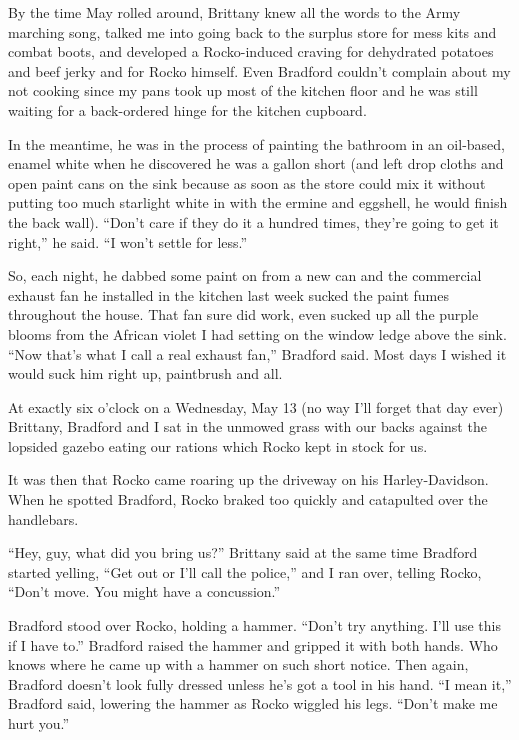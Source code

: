 \documentclass[
]{article}
\begin{document}
By the time May rolled around, Brittany knew all the words to the Army
marching song, talked me into going back to the surplus store for mess
kits and combat boots, and developed a Rocko-induced craving for
dehydrated potatoes and beef jerky and for Rocko himself. Even Bradford
couldn't complain about my not cooking since my pans took up most of the
kitchen floor and he was still waiting for a back-ordered hinge for the
kitchen cupboard.

In the meantime, he was in the process of painting the bathroom in an
oil-based, enamel white when he discovered he was a gallon short (and
left drop cloths and open paint cans on the sink because as soon as the
store could mix it without putting too much starlight white in with the
ermine and egg­shell, he would finish the back wall). ``Don't care if
they do it a hundred times, they're going to get it right,'' he said.
``I won't settle for less.''

So, each night, he dabbed some paint on from a new can and the
commercial exhaust fan he installed in the kitchen last week sucked the
paint fumes throughout the house. That fan sure did work, even sucked up
all the purple blooms from the African violet I had setting on the
window ledge above the sink. ``Now that's what I call a real exhaust
fan,'' Bradford said. Most days I wished it would suck him right up,
paintbrush and all.

At exactly six o'clock on a Wednesday, May 13 (no way I'll forget that
day ever) Brittany, Brad­ford and I sat in the unmowed grass with our
backs against the lopsided gazebo eating our rations which Rocko kept in
stock for us.

It was then that Rocko came roaring up the driveway on his
Harley-Davidson. When he spot­ted Bradford, Rocko braked too quickly and
catapulted over the handlebars.

``Hey, guy, what did you bring us?'' Brittany said at the same time
Bradford started yelling, ``Get out or I'll call the police,'' and I ran
over, telling Rocko, ``Don't move. You might have a con­cussion.''

Bradford stood over Rocko, holding a hammer. ``Don't try anything. I'll
use this if I have to.'' Bradford raised the hammer and gripped it with
both hands. Who knows where he came up with a hammer on such short
notice. Then again, Bradford doesn't look fully dressed unless he's got
a tool in his hand. ``I mean it,'' Bradford said, lowering the hammer as
Rocko wiggled his legs. ``Don't make me hurt you.''
\end{document}
